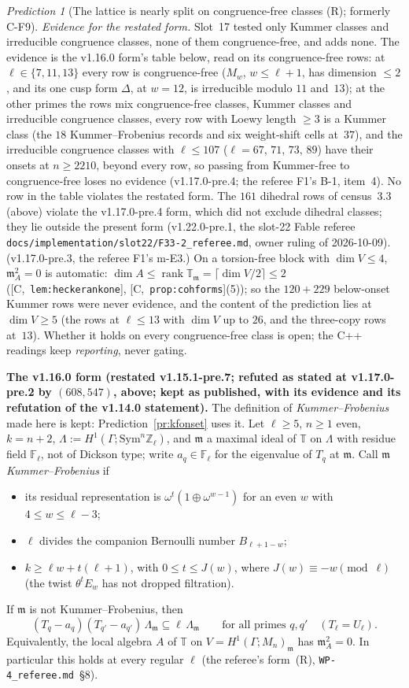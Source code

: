 \documentclass[11pt]{article}
\theoremstyle{remark}
\newtheorem{prediction}[theorem]{Prediction}
\newcommand{\F}{\mathbb{F}}
\newcommand{\Z}{\mathbb{Z}}
\newcommand{\Sym}{\mathrm{Sym}}
\newcommand{\Ga}{\Gamma}
\newcommand{\Fl}{\F_\ell}
\DeclareMathOperator{\rank}{rank}
\newcommand{\T}{\mathbb{T}}
\newcommand{\m}{\mathfrak{m}}
\newcommand{\Mn}{M_n}
\newcommand{\HA}[1]{[C,~\texttt{#1}]}      %
\begin{document}
\begin{prediction}[The lattice is nearly split on congruence-free classes (R); formerly C-F9]
\emph{Evidence for the restated form.} Slot~17 tested only Kummer classes and irreducible congruence classes, none of them congruence-free, and adds none. The
evidence is the v1.16.0 form's table below, read on its congruence-free rows: at $\ell\in\{7,11,13\}$ every row is congruence-free ($M_w$, $w\le\ell+1$, has
dimension $\le2$, and its one cusp form $\Delta$, at $w=12$, is irreducible modulo $11$ and~$13$); at the other primes the rows mix congruence-free classes,
Kummer classes and irreducible congruence classes, every row with Loewy length $\ge3$ is a Kummer class (the $18$ Kummer--Frobenius records and six weight-shift
cells at~$37$), and the irreducible congruence classes with $\ell\le107$ ($\ell=67$, $71$, $73$, $89$) have their onsets at $n\ge2210$, beyond every row, so
passing from Kummer-free to congruence-free loses no evidence (v1.17.0-pre.4; the referee F1's B-1, item~4). No row in the table violates the restated form. The $161$ dihedral rows of census~3.3 (above) violate the
v1.17.0-pre.4 form, which did not exclude dihedral classes; they lie outside the present form (v1.22.0-pre.1, the
slot-22 Fable referee \texttt{docs/implementation/slot22/F33-2\_referee.md}, owner ruling of 2026-10-09). (v1.17.0-pre.3, the referee F1's m-E3.) On a torsion-free block with $\dim V\le4$, $\m_A^2=0$ is automatic:
$\dim A\le\rank\T_\m=\lceil\dim V/2\rceil\le2$ (\HA{lem:heckerankone}, \HA{prop:cohforms}(5)); so the $120+229$ below-onset Kummer rows were never evidence, and
the content of the prediction lies at $\dim V\ge5$ (the rows at $\ell\le13$ with $\dim V$ up to $26$, and the three-copy rows at~$13$). Whether it holds on every
congruence-free class is open; the C++ readings keep \emph{reporting}, never gating.

\medskip\noindent\textbf{The v1.16.0 form (restated v1.15.1-pre.7; refuted as stated at v1.17.0-pre.2 by $(608,547)$, above; kept as published, with its
evidence and its refutation of the v1.14.0 statement).} The definition of \emph{Kummer--Frobenius} made here is kept: Prediction~\ref{pr:kfonset} uses it.
Let $\ell\ge5$, $n\ge1$ even, $k=n+2$, $\Lambda:=H^1(\Ga;\Sym^n\Z_\ell)$, and $\m$ a maximal ideal of $\T$ on $\Lambda$ with residue field
$\Fl$, not of Dickson type; write $a_q\in\Fl$ for the eigenvalue of $T_q$ at $\m$. Call $\m$ \emph{Kummer--Frobenius} if
\begin{itemize}
\item its residual representation is $\omega^t(1\oplus\omega^{w-1})$ for an even $w$ with $4\le w\le\ell-3$;
\item $\ell$ divides the companion Bernoulli number $B_{\ell+1-w}$;
\item $k\ge\ell w+t(\ell+1)$, with $0\le t\le J(w)$, where $J(w)\equiv-w\pmod\ell$ (the twist $\theta^tE_w$ has not dropped filtration).
\end{itemize}
If $\m$ is not Kummer--Frobenius, then
\[
  (T_q-a_q)(T_{q'}-a_{q'})\,\Lambda_\m\subseteq\ell\,\Lambda_\m\qquad\text{for all primes }q,q'\quad(T_\ell=U_\ell).
\]
Equivalently, the local algebra $A$ of $\T$ on $V=H^1(\Ga;\Mn)_\m$ has $\m_A^2=0$. In particular this holds at every regular
$\ell$ (the referee's form~(R), \texttt{WP-4\_referee.md}~\S8).


\end{prediction}
\end{document}

